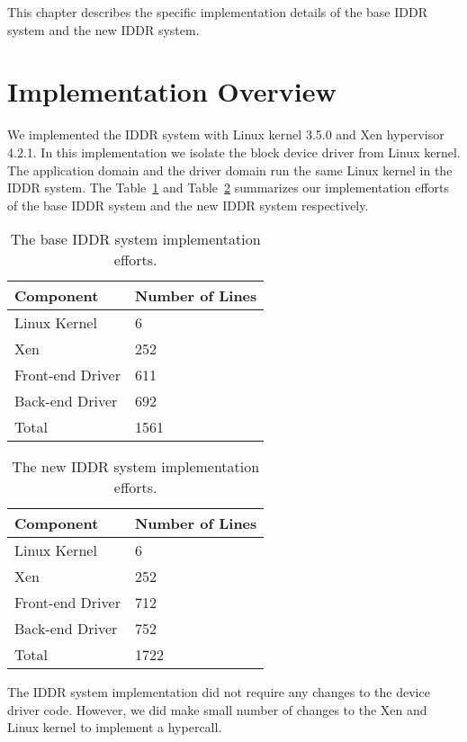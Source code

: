 This chapter describes the specific implementation details of the base IDDR system and the new IDDR system.

\section{Implementation Overview} 
We implemented the IDDR system with Linux kernel 3.5.0 and Xen hypervisor 4.2.1. In this implementation we isolate the block device driver from Linux kernel. The application domain and the driver domain run the same Linux kernel in the IDDR system. The Table~\ref{tab:base} and Table~\ref{tab:new} summarizes our implementation efforts of the base IDDR system and the new IDDR system respectively.

\begin{table}
\caption{The base IDDR system implementation efforts.}
\begin{center}
\begin{tabular}{ll}
  \hline
  \label{tab:base}
  Component & Number of Lines \\
  \hline
  Linux Kernel & 6 \\
  Xen & 252 \\
  Front-end Driver & 611 \\
  Back-end Driver & 692 \\
  \hline 
  Total & 1561\\
  \hline
\end{tabular}
\end{center}
\end{table}

\begin{table}
\caption{The new IDDR system implementation efforts.}
\begin{center}
\begin{tabular}{ll}
  \hline
  \label{tab:new}
  Component & Number of Lines \\
  \hline
  Linux Kernel & 6 \\
  Xen & 252 \\
  Front-end Driver & 712 \\
  Back-end Driver & 752 \\
  \hline 
  Total & 1722\\
  \hline
\end{tabular}
\end{center}
\end{table}

The IDDR system implementation did not require any changes to the device driver code. However, we did make small number of changes to the Xen and Linux kernel to implement a hypercall.

